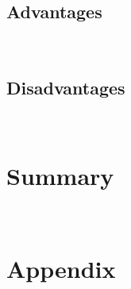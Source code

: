 \documentclass[12pt]{article}
\begin{document}
\subsection{Advantages}
~~
%
\subsection{Disadvantages}
~~
%

\section{Summary}%
~~%

\newpage
\section{Appendix}
\end{document}
